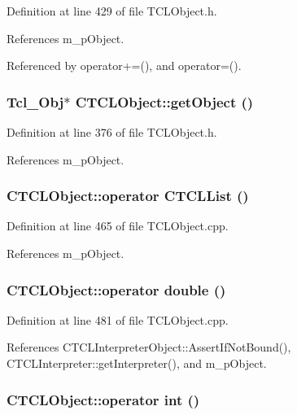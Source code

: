 Definition at line 429 of file TCLObject.h.

References m\_\-p\-Object.

Referenced by operator+=(), and operator=().
\subsubsection{\setlength{\rightskip}{0pt plus 5cm}Tcl\_\-Obj$\ast$ CTCLObject::get\-Object ()\hspace{0.3cm}{\tt  [inline]}}\label{classCTCLObject_a6}




Definition at line 376 of file TCLObject.h.

References m\_\-p\-Object.
\subsubsection{\setlength{\rightskip}{0pt plus 5cm}CTCLObject::operator {\bf CTCLList} ()}\label{classCTCLObject_a14}




Definition at line 465 of file TCLObject.cpp.

References m\_\-p\-Object.
\subsubsection{\setlength{\rightskip}{0pt plus 5cm}CTCLObject::operator double ()}\label{classCTCLObject_a15}




Definition at line 481 of file TCLObject.cpp.

References CTCLInterpreter\-Object::Assert\-If\-Not\-Bound(), CTCLInterpreter::get\-Interpreter(), and m\_\-p\-Object.
\subsubsection{\setlength{\rightskip}{0pt plus 5cm}CTCLObject::operator int ()}\label{classCTCLObject_a13}




